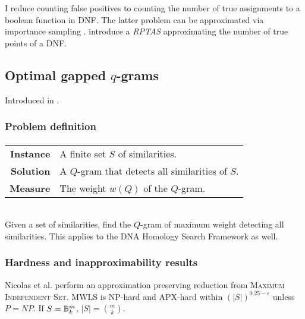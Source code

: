 I reduce counting false positives to counting the number of true assignments to a boolean function in DNF.
The latter problem can be approximated via importance sampling \citep{Vazirani2001}.
\citeauthor{Karp1989} introduce a \emph{RPTAS} approximating the number of true points of a DNF.


\subsection{Optimal gapped $q$-grams}

Introduced in \citep{Nicolas2005}.

\subsubsection{Problem definition}

\paragraph{}
\begin{tabular}{rl}
{\bf Instance}	&	A finite set $S$ of similarities.\\
{\bf Solution}	&	A $Q$-gram that detects all similarities of $S$.\\
{\bf Measure}	&	The weight $w(Q)$ of the $Q$-gram.\\
\end{tabular}
\\

Given a set of similarities, find the $Q$-gram of maximum weight detecting all similarities.
This applies to the DNA Homology Search Framework as well.

\subsubsection{Hardness and inapproximability results}

Nicolas et al. \citep{Nicolas2005} perform an approximation preserving reduction from \textsc{Maximum Independent Set}.
MWLS is NP-hard and APX-hard within $(|S|)^{0.25 - \epsilon}$ unless $P = NP$.
If $S = \mathbb {B}^{m}_{k}$, $|S| = \binom{m}{k}$.

